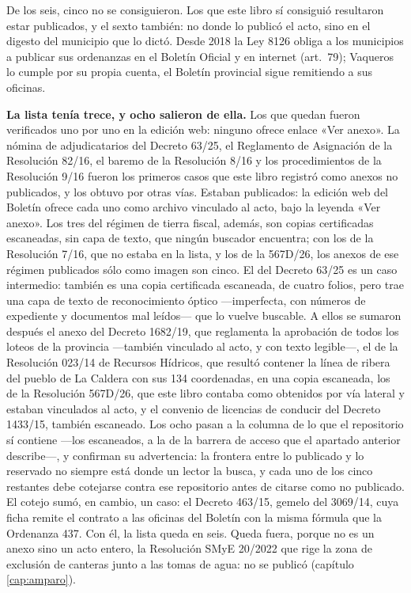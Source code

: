 \begin{cautela}
De los seis, cinco no se consiguieron. Los que este libro sí consiguió resultaron estar publicados, y el sexto también: no donde lo publicó el acto, sino en el digesto del municipio que lo dictó. Desde 2018 la Ley 8126 obliga a los municipios a publicar sus ordenanzas en el Boletín Oficial y en internet (art.\ 79); Vaqueros lo cumple por su propia cuenta, el Boletín provincial sigue remitiendo a sus oficinas.

\textbf{La lista tenía trece, y ocho salieron de ella.} Los que quedan fueron verificados uno por uno en la edición web: ninguno ofrece enlace «Ver anexo». La nómina de adjudicatarios del Decreto 63/25, el Reglamento de Asignación de la Resolución 82/16, el baremo de la Resolución 8/16 y los procedimientos de la Resolución 9/16 fueron los primeros casos que este libro registró como anexos no publicados, y los obtuvo por otras vías. Estaban publicados: la edición web del Boletín ofrece cada uno como archivo vinculado al acto, bajo la leyenda «Ver anexo». Los tres del régimen de tierra fiscal, además, son copias certificadas escaneadas, sin capa de texto, que ningún buscador encuentra; con los de la Resolución 7/16, que no estaba en la lista, y los de la 567D/26, los anexos de ese régimen publicados sólo como imagen son cinco. El del Decreto 63/25 es un caso intermedio: también es una copia certificada escaneada, de cuatro folios, pero trae una capa de texto de reconocimiento óptico ---imperfecta, con números de expediente y documentos mal leídos--- que lo vuelve buscable. A ellos se sumaron después el anexo del Decreto 1682/19, que reglamenta la aprobación de todos los loteos de la provincia ---también vinculado al acto, y con texto legible---, el de la Resolución 023/14 de Recursos Hídricos, que resultó contener la línea de ribera del pueblo de La Caldera con sus 134 coordenadas, en una copia escaneada, los de la Resolución 567D/26, que este libro contaba como obtenidos por vía lateral y estaban vinculados al acto, y el convenio de licencias de conducir del Decreto 1433/15, también escaneado. Los ocho pasan a la columna de lo que el repositorio sí contiene ---los escaneados, a la de la barrera de acceso que el apartado anterior describe---, y confirman su advertencia: la frontera entre lo publicado y lo reservado no siempre está donde un lector la busca, y cada uno de los cinco restantes debe cotejarse contra ese repositorio antes de citarse como no publicado. El cotejo sumó, en cambio, un caso: el Decreto 463/15, gemelo del 3069/14, cuya ficha remite el contrato a las oficinas del Boletín con la misma fórmula que la Ordenanza 437. Con él, la lista queda en seis. Queda fuera, porque no es un anexo sino un acto entero, la Resolución SMyE 20/2022 que rige la zona de exclusión de canteras junto a las tomas de agua: no se publicó (capítulo \ref{cap:amparo}).


\end{cautela}
